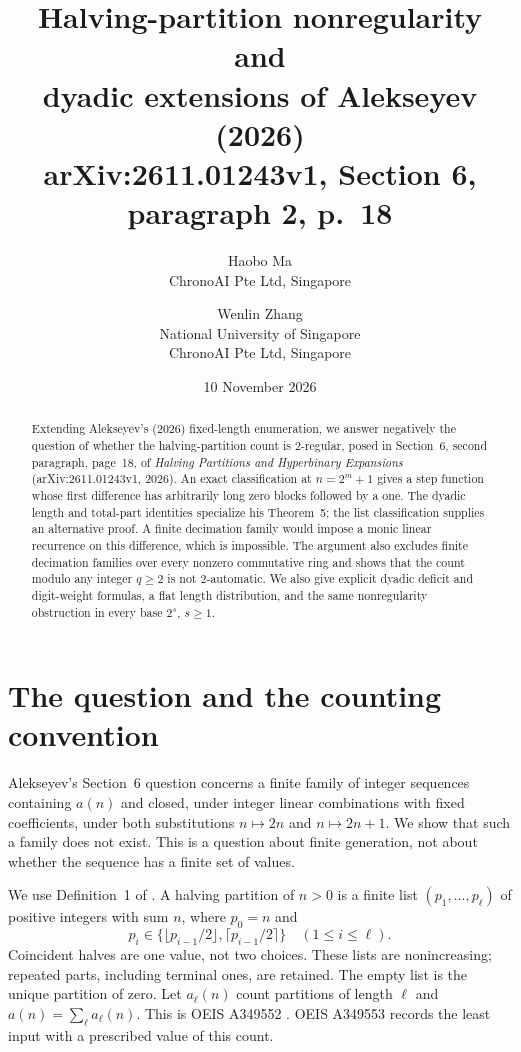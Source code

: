 \documentclass[11pt]{article}
\title{Halving-partition nonregularity and\protect\\
dyadic extensions of Alekseyev (2026)\protect\\
arXiv:2611.01243v1, Section 6, paragraph 2, p.\ 18}
\author{Haobo Ma\\{\small ChronoAI Pte Ltd, Singapore}
\and Wenlin Zhang\\{\small National University of Singapore}\\
{\small ChronoAI Pte Ltd, Singapore}}
\date{10 November 2026}
\begin{document}
\maketitle
\begin{abstract}
Extending Alekseyev's (2026) fixed-length enumeration, we answer negatively
the question of whether the halving-partition count is
$2$-regular, posed in Section~6, second paragraph, page~18, of
\emph{Halving Partitions and Hyperbinary Expansions}
(arXiv:2611.01243v1, 2026).
An exact classification at $n=2^m+1$ gives a step function whose first
difference has arbitrarily long zero blocks followed by a one.
The dyadic length and total-part identities specialize his Theorem~5;
the list classification supplies an alternative proof.
A finite decimation family would impose a monic linear recurrence on this
difference, which is impossible. The argument also excludes finite
decimation families over every nonzero commutative ring and shows that the
count modulo any integer $q\ge2$ is not $2$-automatic. We also give explicit
dyadic deficit and digit-weight formulas, a flat length distribution,
and the same nonregularity obstruction in every base $2^s$, $s\ge1$.
\end{abstract}

\section{The question and the counting convention}
Alekseyev's Section~6 question \cite[p.~18]{alekseyev} concerns a finite
family of integer sequences containing $a(n)$ and closed, under integer
linear combinations with fixed coefficients, under both substitutions
$n\mapsto2n$ and $n\mapsto2n+1$. We show that such a family does not exist.
This is a question about finite generation, not about whether the sequence
has a finite set of values.

We use Definition~1 of \cite[p.~1]{alekseyev}. A halving partition of $n>0$
is a finite list $(p_1,\ldots,p_\ell)$ of positive integers with sum $n$,
where $p_0=n$ and
\[
 p_i\in\{\lfloor p_{i-1}/2\rfloor,\lceil p_{i-1}/2\rceil\}
 \quad(1\le i\le\ell).
\]
Coincident halves are one value, not two choices. These lists are
nonincreasing; repeated parts, including terminal ones, are retained.
The empty list is the unique partition of zero. Let $a_\ell(n)$ count
partitions of length $\ell$ and $a(n)=\sum_\ell a_\ell(n)$.
This is OEIS A349552 \cite{oeis}. OEIS A349553 records the least input
with a prescribed value of this count.
\end{document}
